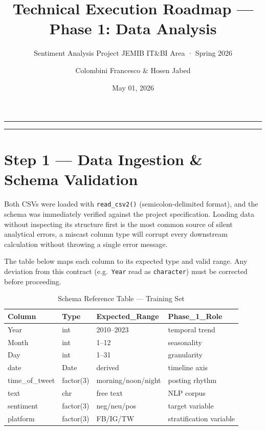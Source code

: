\documentclass[
]{article}
\title{Technical Execution Roadmap --- Phase 1: Data Analysis}
\subtitle{Sentiment Analysis Project \textbar{} JEMIB IT\&BI Area ·
Spring 2026}
\author{Colombini Francesco \& Hosen Jabed}
\date{May 01, 2026}
\begin{document}
\maketitle

{
\setcounter{tocdepth}{4}
\tableofcontents
}
\begin{center}\rule{0.5\linewidth}{0.5pt}\end{center}

\begin{center}\rule{0.5\linewidth}{0.5pt}\end{center}

\section{Step 1 --- Data Ingestion \& Schema
Validation}\label{step-1-data-ingestion-schema-validation}

Both CSVs were loaded with \texttt{read\_csv2()} (semicolon-delimited
format), and the schema was immediately verified against the project
specification. Loading data without inspecting its structure first is
the most common source of silent analytical errors, a miscast column
type will corrupt every downstream calculation without throwing a single
error message.

The table below maps each column to its expected type and valid range.
Any deviation from this contract (e.g.~\texttt{Year} read as
\texttt{character}) must be corrected before proceeding.

\begin{longtable}[t]{llll}
\caption{\label{tab:schema-table}Schema Reference Table — Training Set}\\
\toprule
Column & Type & Expected\_Range & Phase\_1\_Role\\
\midrule
Year & int & 2010–2023 & temporal trend\\
Month & int & 1–12 & seasonality\\
Day & int & 1–31 & granularity\\
date & Date & derived & timeline axis\\
time\_of\_tweet & factor(3) & morning/noon/night & posting rhythm\\
\addlinespace
text & chr & free text & NLP corpus\\
sentiment & factor(3) & neg/neu/pos & target variable\\
platform & factor(3) & FB/IG/TW & stratification variable\\
\bottomrule
\end{longtable}
\end{document}
